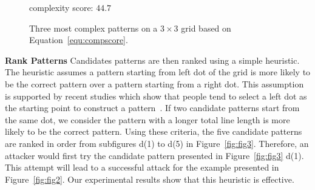 \begin{figure}[!t]
{\begin{minipage}[b]{0.14\textwidth}
                \centering \footnotesize complexity score: $44.7$
                \end{minipage}
            }
            \vspace{-2mm}
            \caption{Three most complex patterns on a $3\times 3$ grid based on Equation~\ref{equ:compscore}.}
            \vspace{-2mm}
            \label{fig:most complex patterns}
        \end{figure}


        \noindent \textbf{Rank Patterns} Candidates patterns are then ranked using a simple
        heuristic. The heuristic assumes a pattern starting from
        left dot of the grid is more likely to be the correct pattern over a
         pattern starting from a right dot. This assumption is supported
        by recent studies which show that people tend to select a left dot as the starting point
        to construct a pattern~\cite{uellenbeck2013quantifying,alpnorway}.
         If two candidate patterns
         start from the same dot, we consider the pattern with a
        longer total line length
        is more likely to be the correct pattern. Using these criteria,
        the five candidate patterns are ranked in order from subfigures d(1) to d(5) in
        Figure~\ref{fig:fig3}. Therefore, an attacker would first try the candidate
        pattern presented in Figure~\ref{fig:fig3} d(1).  This attempt will lead to a
        successful attack for the example presented in Figure~\ref{fig:fig2}. Our experimental results show that
        this heuristic is effective.


